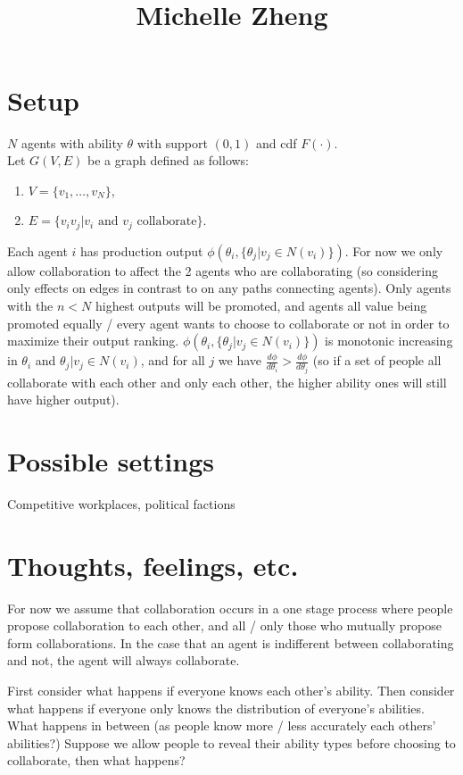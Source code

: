 \documentclass[11pt]{article}
\title{\vspace{-50pt}
\Huge \name
\\\vspace{20pt}
\huge Michelle Zheng\hfill }
\author{}
\date{}
\theoremstyle{quest}
\begin{document}
\maketitle

\section{Setup}
$N$ agents with ability $\theta$ with support $(0,1)$ and cdf $F(\cdot)$. \\
Let $G(V,E)$ be a graph defined as follows:
\begin{enumerate}
    \item $V = \{v_1, \dots, v_N\}$,
    \item $E = \{v_iv_j | v_i \text{ and } v_j \text{ collaborate}\}$.
\end{enumerate}
Each agent $i$ has production output $\phi(\theta_i, \{\theta_j | v_j\in N(v_i)\})$. For now we only allow collaboration to affect the 2 agents who are collaborating (so considering only effects on edges in contrast to on any paths connecting agents). Only agents with the $n<N$ highest outputs will be promoted, and agents all value being promoted equally / every agent wants to choose to collaborate or not in order to maximize their output ranking.
$\phi(\theta_i,\{\theta_j|v_j\in N(v_i)\})$ is monotonic increasing in $\theta_i$ and $\theta_j|v_j\in N(v_i)$, and for all $j$ we have $\frac{d\phi}{d\theta_i} > \frac{d\phi}{d\theta_j}$ (so if a set of people all collaborate with each other and only each other, the higher ability ones will still have higher output).

\section{Possible settings}
Competitive workplaces, political factions

\section{Thoughts, feelings, etc.}
For now we assume that collaboration occurs in a one stage process where people propose collaboration to each other, and all / only those who mutually propose form collaborations. In the case that an agent is indifferent between collaborating and not, the agent will always collaborate. 

First consider what happens if everyone knows each other's ability. Then consider what happens if everyone only knows the distribution of everyone's abilities. What happens in between (as people know more / less accurately each others' abilities?) Suppose we allow people to reveal their ability types before choosing to collaborate, then what happens?
\end{document}
